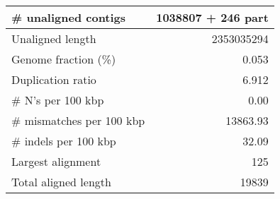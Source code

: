 \documentclass[12pt,a4paper]{article}
\begin{document}
\begin{table}[ht]
\begin{center}
\begin{tabular}{|l*{1}{|r}|}
\# unaligned contigs & 1038807 + 246 part \\ \hline
Unaligned length & 2353035294 \\ \hline
Genome fraction (\%) & 0.053 \\ \hline
Duplication ratio & 6.912 \\ \hline
\# N's per 100 kbp & 0.00 \\ \hline
\# mismatches per 100 kbp & 13863.93 \\ \hline
\# indels per 100 kbp & 32.09 \\ \hline
Largest alignment & 125 \\ \hline
Total aligned length & 19839 \\ \hline
\end{tabular}
\end{center}
\end{table}
\end{document}
